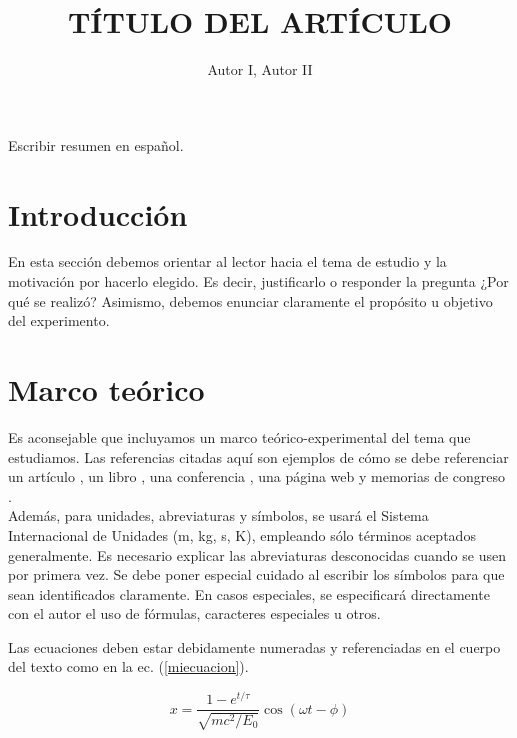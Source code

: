\documentclass{estilos}
\title{TÍTULO DEL ARTÍCULO}
\author{Autor I\suprm1, Autor II \suprm2 }
\begin{document}
  \maketitle

\begin{resumen}
\noindent Escribir resumen en español.
\end{resumen}


\section*{Introducción}
En esta sección debemos orientar al lector hacia el tema de estudio y la
motivación por hacerlo elegido. Es decir, justificarlo o responder la pregunta
¿Por qué se realizó? Asimismo, debemos enunciar claramente el
propósito u objetivo del experimento.

\section*{Marco teórico}
Es aconsejable que incluyamos un marco teórico-experimental del tema
que estudiamos. Las referencias citadas aquí son ejemplos de cómo se debe referenciar un artículo \cite{1}, un libro \cite{2}, una conferencia \cite{3}, una página web \cite{4} y memorias de congreso \cite{5}.\\

Además, para unidades, abreviaturas y símbolos, se usará el Sistema Internacional de Unidades (m, kg, s, K), empleando sólo términos aceptados generalmente. Es necesario explicar las abreviaturas desconocidas cuando se usen por primera vez. Se debe poner especial cuidado al escribir los símbolos para que sean identificados claramente. En casos especiales, se especificará directamente con el autor el uso de fórmulas, caracteres especiales u otros.

Las ecuaciones deben estar debidamente numeradas y referenciadas en el cuerpo del texto como en la ec. (\ref{miecuacion}).

\begin{equation}
\label{miecuacion}
x = \frac{1- e^{t/\tau}}{\sqrt{mc^2/E_0}}\cos(\omega t-\phi)
\end{equation}
\end{document}
